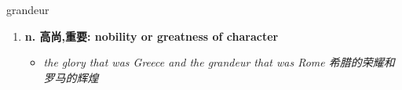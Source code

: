 
\begin{frame}
{\huge grandeur}
\begin{center}
\begin{enumerate}\Large
  \item \textbf{n. 高尚,重要: nobility or greatness of character}
  \begin{itemize}
    \item \em{\Large{the glory that was Greece and the grandeur that was Rome 希腊的荣耀和罗马的辉煌}}
  \end{itemize}
\end{enumerate}
\end{center}
\end{frame}
